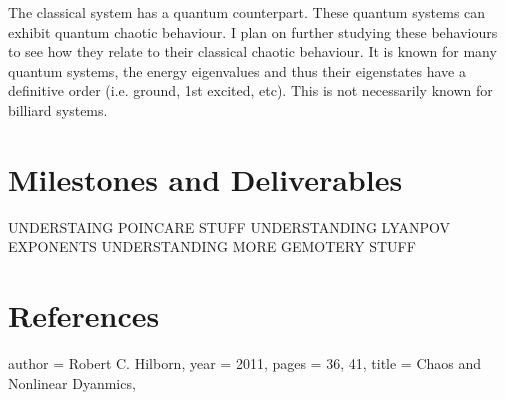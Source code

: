 \documentclass[12pt,a4paper]{amsart}
\begin{document}
The classical system has a quantum counterpart. These quantum systems can exhibit quantum chaotic behaviour. I plan on further studying these behaviours to see how they relate to their classical chaotic behaviour. It is known for many quantum systems, the energy eigenvalues and thus their eigenstates have a definitive order (i.e. ground, 1st excited, etc). This is not necessarily known for billiard systems.

\newpage

\section{Milestones and Deliverables}

UNDERSTAING POINCARE STUFF
UNDERSTANDING LYANPOV EXPONENTS
UNDERSTANDING MORE GEMOTERY STUFF

\section*{References} 
\begin{biblist}
    {
    author = {Robert C. Hilborn},
    year = {2011},
    pages = {36, 41},
    title = {Chaos and Nonlinear Dyanmics},
    }
\end{biblist}
\end{document}
